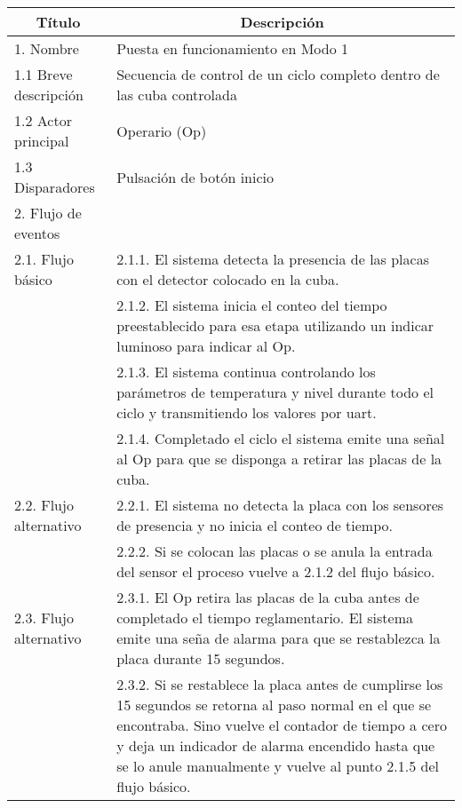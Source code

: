 \begin{table}[h!]
\begin{flushleft}
\begin{tabular}{|m{3cm}|m{11cm}|}\hline
\multicolumn{1}{|c|}{\textbf{Título}} & \multicolumn{1}{c|}{\textbf{Descripción}} \\ \hline
1. Nombre & Puesta en funcionamiento en Modo 1 \\ \hline
1.1 Breve descripción  & Secuencia de control de un ciclo completo dentro de las cuba controlada  \\ \hline
1.2 Actor principal  & Operario (Op) \\ \hline
1.3 Disparadores  & Pulsación de botón inicio \\ \hline
2. Flujo de eventos &  \\ \hline
\multicolumn{ 1}{|l|}{2.1. Flujo básico} & 2.1.1. El sistema detecta la presencia de las placas con el detector colocado en la cuba. \\ \cline{ 2- 2}
\multicolumn{ 1}{|l|}{} & 2.1.2. El sistema inicia el conteo del tiempo preestablecido para esa etapa utilizando un indicar luminoso para indicar al Op. \\ \cline{ 2- 2}
\multicolumn{ 1}{|l|}{} & 2.1.3. El sistema continua controlando los parámetros de temperatura y nivel durante todo el ciclo y transmitiendo los valores por uart. \\ \cline{ 2- 2}
\multicolumn{ 1}{|l|}{} & 2.1.4. Completado el ciclo el sistema emite una señal al Op para que se disponga a retirar las placas de la cuba. \\ \hline
\multicolumn{ 1}{|l|}{2.2. Flujo alternativo } & 2.2.1. El sistema no detecta la placa con los sensores de presencia y no inicia el conteo de tiempo. \\ \cline{ 2- 2}
\multicolumn{ 1}{|l|}{} & 2.2.2. Si se colocan las placas o se anula la entrada del sensor el proceso vuelve a 2.1.2 del flujo básico. \\ \hline
\multicolumn{ 1}{|l|}{2.3. Flujo alternativo } & 2.3.1. El Op retira las placas de la cuba antes de completado el tiempo reglamentario. El sistema emite una seña de alarma para que se restablezca la placa durante 15 segundos. \\ \cline{ 2- 2}
\multicolumn{ 1}{|l|}{} & 2.3.2. Si se restablece la placa antes de cumplirse los 15 segundos se retorna al paso normal en el que se encontraba. Sino vuelve el contador de tiempo a cero y deja un indicador de alarma encendido hasta que se lo anule manualmente y vuelve al punto 2.1.5 del flujo básico. \\ \hline

\end{tabular}
\end{flushleft}
\end{table}
